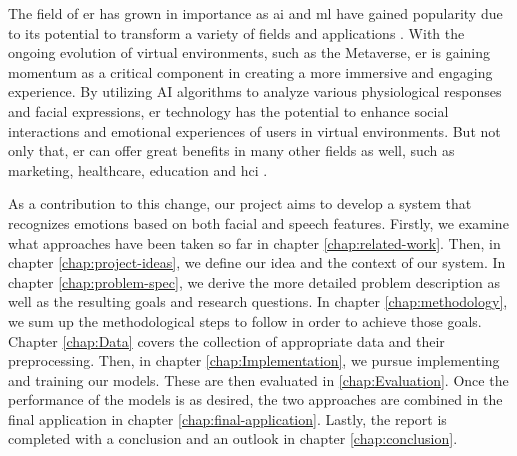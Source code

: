  \noindent The field of \acrfull{er} has grown in importance as \acrfull{ai} and \acrfull{ml} have gained popularity due to its potential to transform a variety of fields and applications \cite{er-appl}. With the ongoing evolution of virtual environments, such as the Metaverse, \acrshort{er} is gaining momentum as a critical component in creating a more immersive and engaging experience. By utilizing AI algorithms to analyze various physiological responses and facial expressions, \acrshort{er} technology has the potential to enhance social interactions and emotional experiences of users in virtual environments. But not only that, \acrshort{er} can offer great benefits in many other fields as well, such as marketing, healthcare, education and \acrfull{hci} \cite{er-appl,healthcare, EGGER201935}. \par
 \noindent
 As a contribution to this change, our project aims to develop a system that recognizes emotions based on both facial and speech features. Firstly, we examine what approaches have been taken so far in chapter \ref{chap:related-work}. Then, in chapter \ref{chap:project-ideas}, we define our idea and the context of our system. In chapter \ref{chap:problem-spec}, we derive the more detailed problem description as well as the resulting goals and research questions. In chapter \ref{chap:methodology}, we sum up the methodological steps to follow in order to achieve those goals. Chapter \ref{chap:Data} covers the collection of appropriate data and their preprocessing. Then, in chapter \ref{chap:Implementation}, we pursue implementing and training our models. These are then evaluated in \ref{chap:Evaluation}. Once the performance of the models is as desired, the two approaches are combined in the final application in chapter \ref{chap:final-application}. Lastly, the report is completed with a conclusion and an outlook in chapter \ref{chap:conclusion}.

